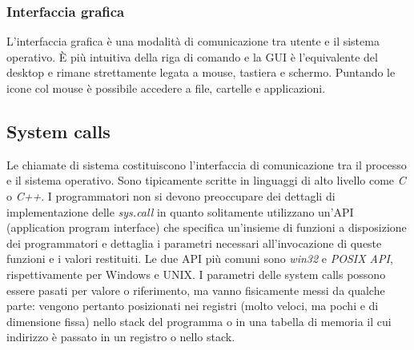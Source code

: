 \subsubsection{Interfaccia grafica}
L'interfaccia grafica \`e una modalit\`a di comunicazione tra utente e il sistema operativo. \`E pi\`u intuitiva della riga di comando e la GUI \`e l'equivalente del desktop e rimane strettamente legata a mouse, tastiera e schermo.
Puntando le icone col mouse \`e possibile accedere a file, cartelle e applicazioni. 
\subsection{System calls}
Le chiamate di sistema costituiscono l'interfaccia di comunicazione tra il processo e il sistema operativo. Sono tipicamente scritte in linguaggi di alto livello come \emph{C} o \emph{C++}. I programmatori non si devono preoccupare dei
dettagli di implementazione delle \emph{sys.call} in quanto solitamente utilizzano un'API (application program interface) che specifica un'insieme di funzioni a disposizione dei programmatori e dettaglia i parametri necessari 
all'invocazione di queste funzioni e i valori restituiti. Le due API pi\`u comuni sono \emph{win32} e \emph{POSIX API}, rispettivamente per Windows e UNIX. I parametri delle system calls possono essere pasati per valore o riferimento, ma
vanno fisicamente messi da qualche parte: vengono pertanto posizionati nei registri (molto veloci, ma pochi e di dimensione fissa) nello stack del programma o in una tabella di memoria il cui indirizzo \`e passato in un registro o nello
stack.
